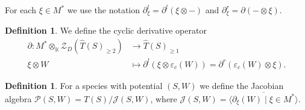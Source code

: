 \documentclass[a4paper, reqno]{amsart}
\newtheorem{mylemma}[mythm]{Lemma}
\theoremstyle{definition}
\newtheorem{mydef}[mythm]{Definition}
\newtheorem{myrem}[mythm]{Remark}
\newcommand{\K}{\mathbb{K}}
\begin{document}
For each $\xi\in M^*$ we use the notation $\partial^l_\xi = \partial^l(\xi\otimes-)$ and $\partial^r_\xi = \partial(-\otimes \xi)$.

\begin{mydef}
	We define the cyclic derivative operator
	\begin{equation*}
		\begin{aligned}
			\partial: M^*\otimes_\K \mathcal{Z}_D(\widehat{T}(S)_{\ge 2}) &\to \widehat{T}(S)_{\ge 1} \\
			\xi\otimes W &\mapsto \partial^l(\xi\otimes \varepsilon_c(W)) = \partial^r(\varepsilon_c(W)\otimes \xi).
		\end{aligned}
	\end{equation*}
\end{mydef}

\begin{mydef}
	For a species with potential $(S, W)$ we define the Jacobian algebra $\mathcal{P}(S, W) = \widehat{T}(S)/\mathcal{J}(S, W)$, where $\mathcal{J}(S, W) = \overline{\langle \partial_\xi (W) \mid \xi\in M^*\rangle}$. 
\end{mydef}
\end{document}
